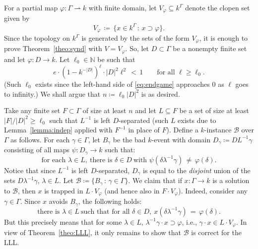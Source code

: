 \documentclass[11pt, reqno, psamsfonts]{amsart}
\theoremstyle{bfnote}
\theoremstyle{claim}
\theoremstyle{definition}
\theoremstyle{remark}
\newcommand{\0}{\varnothing}
\newcommand{\set}[1]{\{#1\}}
\newcommand{\N}{{\mathbb{N}}}
\renewcommand{\phi}{\varphi}
\renewcommand{\geq}{\geqslant}
\renewcommand{\G}{\Gamma}
\newcommand{\defeq}{\coloneqq}
\newcommand{\B}{{\mathscr{B}}}
\newcommand{\bemph}[1]{{\normalfont#1}} %
\newcommand{\ep}[1]{\bemph{(}#1\bemph{)}} %
\numberwithin{equation}{section}
\begin{document}
	For a partial map $\phi \colon \G \rightharpoonup k$ with finite domain, let $V_\phi \subseteq k^\G$ denote the clopen set given by
	\[
	V_\phi \,\defeq\, \set{x \in k^\G \,:\, x \supset \phi}.
	\]
	Since the topology on $k^\G$ is generated by the sets of the form $V_\phi$, it is enough to prove Theorem~\ref{theo:synd} with $V = V_\phi$. So, let $D \subset \G$ be a nonempty finite set and let $\phi \colon D \to k$. Let $\ell_0 \in \N$ be such that
	\begin{equation}\label{eq:endgame}
		e \cdot (1 - k^{-|D|})^\ell \cdot |D|^2\ell^2 \,<\, 1 \qquad \text{for all } \ell \geq \ell_0.
	\end{equation}
	\ep{Such $\ell_0$ exists since the left-hand side of \eqref{eq:endgame} approaches $0$ as $\ell$ goes to infinity.} We shall argue that $n \defeq \ell_0|D|^2$ is as desired.
	
	Take any finite set $F \subset \G$ of size at least $n$ and let $L \subseteq F$ be a set of size at least $|F|/|D|^2 \geq \ell_0$ such that $L^{-1}$ is left $D$-separated \ep{such $L$ exists due to Lemma~\ref{lemma:indep} applied with $F^{-1}$ in place of $F$}. Define a $k$-instance $\B$ over $\G$ as follows. For each $\gamma \in \G$, let $B_\gamma$ be the bad $k$-event with domain $D_\gamma \defeq D L^{-1}\gamma$ consisting of all maps $\psi \colon D_\gamma \to k$ such that:
	\[
	\text{for each } \lambda \in L,\ \text{there is } \delta \in D\ \text{with } \psi(\delta\lambda^{-1}\gamma) \,\neq\, \phi(\delta).
	\]
	Notice that since $L^{-1}$ is left $D$-separated, $D_\gamma$ is equal to the \emph{disjoint} union of the sets $D \lambda^{-1}\gamma$, $\lambda \in L$. Let $\B\defeq \set{B_\gamma \,:\, \gamma \in \G}$. We claim that if $x \colon \G\to k$ is a solution to $\B$, then $x$ is trapped in $L \cdot V_\phi$ \ep{and hence also in $F \cdot V_\phi$}. Indeed, consider any $\gamma \in \G$. Since $x$ avoids $B_\gamma$, the following holds:
	\[
		\text{there is } \lambda \in L\ \text{such that for all } \delta \in D, \ x(\delta \lambda^{-1}\gamma) \,=\, \phi(\delta).
	\]
	But this precisely means that for some $\lambda \in L$, $\lambda^{-1}\gamma \cdot x \supset \phi$, i.e., $\gamma \cdot x \in L \cdot V_\phi$. In view of Theorem~\ref{theo:LLL}, it only remains to show that $\B$ is correct for the LLL.
	
\end{document}

